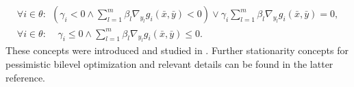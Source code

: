 \begin{eqnarray}
    \forall i\in\theta:\;\, (\gamma_{i}<0\wedge\sum\limits_{l=1}^{m}\beta
_{l}\nabla_{y_{l}}g_{i}(\bar{x},\bar{y})<0)\vee\gamma_{i}\sum\limits_{l=1}%
^{m}\beta_{l}\nabla_{y_{l}}g_{i}(\bar{x},\bar{y})=0,\label{S7b}\\
\forall i\in\theta:\;\, \text{ \ }\gamma_{i}\leq0\wedge\sum\limits_{l=1}^{m}%
\beta_{l}\nabla_{y_{l}}g_{i}(\bar{x},\bar{y})\leq0. \label{9b}
\end{eqnarray}
These concepts were introduced and studied in \cite{D2}. Further stationarity concepts for pessimistic bilevel optimization and relevant details can be found in the latter reference.

